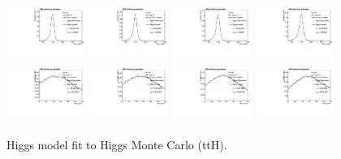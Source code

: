 \begin{figure}[thb]
  \centering
\includegraphics[width=0.23\textwidth]{figures/sec-signals/HiggsShapes/tth_HM_signal_fit_mgg_cat0.pdf}
\includegraphics[width=0.23\textwidth]{figures/sec-signals/HiggsShapes/tth_HM_signal_fit_mgg_cat1.pdf}
\includegraphics[width=0.23\textwidth]{figures/sec-signals/HiggsShapes/tth_LM_signal_fit_mgg_cat0.pdf}
\includegraphics[width=0.23\textwidth]{figures/sec-signals/HiggsShapes/tth_LM_signal_fit_mgg_cat1.pdf}
\includegraphics[width=0.23\textwidth]{figures/sec-signals/HiggsShapes/tth_HM_signal_fit_mjj_cat0.pdf}
\includegraphics[width=0.23\textwidth]{figures/sec-signals/HiggsShapes/tth_HM_signal_fit_mjj_cat1.pdf}
\includegraphics[width=0.23\textwidth]{figures/sec-signals/HiggsShapes/tth_LM_signal_fit_mjj_cat0.pdf}
\includegraphics[width=0.23\textwidth]{figures/sec-signals/HiggsShapes/tth_LM_signal_fit_mjj_cat1.pdf}
  \caption{Higgs model fit to Higgs Monte Carlo (ttH).}
  \label{fig:higgs_fit_tth}
\end{figure}



